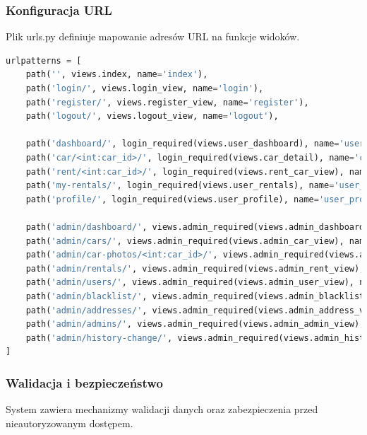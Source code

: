 \documentclass[12pt,a4paper]{article}
\begin{document}
\subsubsection{Konfiguracja URL}

Plik urls.py definiuje mapowanie adresów URL na funkcje widoków.

\begin{lstlisting}[language=Python, caption={Fragment konfiguracji URL}]
urlpatterns = [
    path('', views.index, name='index'),
    path('login/', views.login_view, name='login'),
    path('register/', views.register_view, name='register'),
    path('logout/', views.logout_view, name='logout'),
    
    path('dashboard/', login_required(views.user_dashboard), name='user_dashboard'),
    path('car/<int:car_id>/', login_required(views.car_detail), name='car_detail'),
    path('rent/<int:car_id>/', login_required(views.rent_car_view), name='rent_car'),
    path('my-rentals/', login_required(views.user_rentals), name='user_rentals'),
    path('profile/', login_required(views.user_profile), name='user_profile'),
    
    path('admin/dashboard/', views.admin_required(views.admin_dashboard), name='admin_dashboard'),
    path('admin/cars/', views.admin_required(views.admin_car_view), name='admin_car_view'),
    path('admin/car-photos/<int:car_id>/', views.admin_required(views.admin_car_photos), name='admin_car_photos'),
    path('admin/rentals/', views.admin_required(views.admin_rent_view), name='admin_rent_view'),
    path('admin/users/', views.admin_required(views.admin_user_view), name='admin_user_view'),
    path('admin/blacklist/', views.admin_required(views.admin_blacklist_view), name='admin_blacklist_view'),
    path('admin/addresses/', views.admin_required(views.admin_address_view), name='admin_address_view'),
    path('admin/admins/', views.admin_required(views.admin_admin_view), name='admin_admin_view'),
    path('admin/history-change/', views.admin_required(views.admin_histroy_change_list), name='admin_history_change_list'),
]
\end{lstlisting}

\newpage

\subsubsection{Walidacja i bezpieczeństwo}

System zawiera mechanizmy walidacji danych oraz zabezpieczenia przed nieautoryzowanym dostępem.
\end{document}

